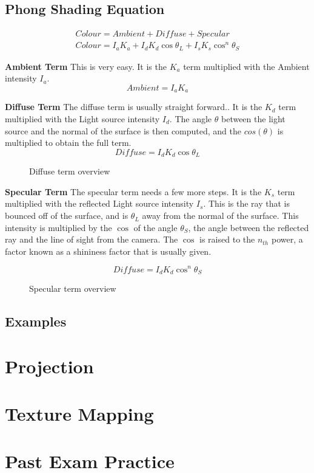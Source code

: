 \subsection{Phong Shading Equation}
\begin{equation}
\label{eqn:phongEqn}
\begin{split}
Colour = Ambient + Diffuse + Specular \\
Colour = I_aK_a + I_dK_d\cos{\theta_L} + I_sK_s\cos^n{\theta_S} 
\end{split}
\end{equation}

\textbf{Ambient Term}
This is very easy. It is the $K_{a}$ term multiplied with the Ambient intensity $I_{a}$.
\begin{equation}
\label{eqn:phongAmbient}
Ambient = I_aK_a
\end{equation}

\textbf{Diffuse Term}
The diffuse term is usually straight forward.. It is the $K_{d}$ term multiplied with the Light source intensity $I_{d}$. The angle $\theta$ between the light source and the normal of the surface is then computed, and the $cos(\theta)$ is multiplied to obtain the full term.
\begin{equation}
\label{eqn:phongDiffuse}
Diffuse =  I_dK_d\cos{\theta_L}
\end{equation}

\begin{figure}[!htb]
\caption{\label{fig:diffuse} Diffuse term overview}
\end{figure}

\textbf{Specular Term}
The specular term needs a few more steps. It is the $K_{s}$ term multiplied with the reflected Light source intensity $I_{s}$. This is the ray that is bounced off of the surface, and is $\theta_L$ away from the normal of the surface. This intensity is multiplied by the $\cos$ of the angle $\theta_S$, the angle between the reflected ray and the line of sight from the camera. The $\cos$ is raised to the $n_{th}$ power, a factor known as a shininess factor that is usually given.

\begin{equation}
\label{eqn:phongSpecular}
Diffuse =  I_dK_d\cos^n{\theta_S}
\end{equation}
\begin{figure}[!htb]
	\caption{\label{fig:specular} Specular term overview}
\end{figure}

\subsection{Examples}

\newpage
\section{Projection}
\newpage
\section{Texture Mapping}
\newpage
\section{Past Exam Practice}